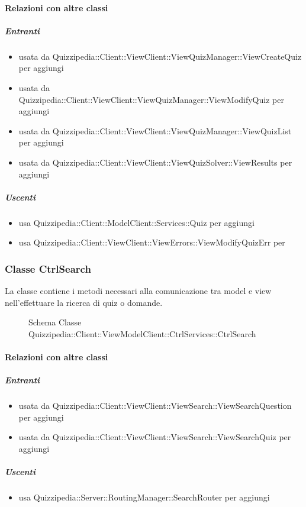 \paragraph{Relazioni con altre classi}
\subparagraph{Entranti}
\begin{itemize}
\item usata da Quizzipedia::Client::ViewClient::ViewQuizManager::ViewCreateQuiz per aggiungi
\item usata da Quizzipedia::Client::ViewClient::ViewQuizManager::ViewModifyQuiz per aggiungi
\item usata da Quizzipedia::Client::ViewClient::ViewQuizManager::ViewQuizList per aggiungi
\item usata da Quizzipedia::Client::ViewClient::ViewQuizSolver::ViewResults per aggiungi
\end{itemize}
\subparagraph{Uscenti}
\begin{itemize}
\item usa Quizzipedia::Client::ModelClient::Services::Quiz per aggiungi
\item usa Quizzipedia::Client::ViewClient::ViewErrors::ViewModifyQuizErr per 
\end{itemize}
\subsubsection{Classe CtrlSearch}
La classe contiene i metodi necessari alla comunicazione tra model e view nell'effettuare la ricerca di quiz o domande.
\begin{figure}[H]
\centering
\noindent{}
\caption[Schema Classe CtrlSearch]{Schema Classe Quizzipedia::Client::ViewModelClient::CtrlServices::CtrlSearch}
\end{figure}
\paragraph{Relazioni con altre classi}
\subparagraph{Entranti}
\begin{itemize}
\item usata da Quizzipedia::Client::ViewClient::ViewSearch::ViewSearchQuestion per aggiungi
\item usata da Quizzipedia::Client::ViewClient::ViewSearch::ViewSearchQuiz per aggiungi
\end{itemize}
\subparagraph{Uscenti}
\begin{itemize}
\item usa Quizzipedia::Server::RoutingManager::SearchRouter per aggiungi
\end{itemize}
